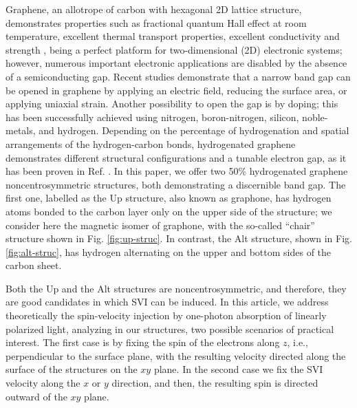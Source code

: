 \documentclass[floatfix,prb,aps,superscriptaddress,showpacs,11pt,preprint,letterpaper]{revtex4}
\begin{document}
Graphene, an allotrope of carbon with hexagonal 2D lattice structure,
demonstrates properties such as fractional quantum Hall effect at room
temperature, excellent thermal transport properties, excellent
conductivity\cite{heerscheNat07} and strength \cite{geimNM07, reinaNL08,
novoselov2S07, balandinNL08}, being a perfect platform  for two-dimensional (2D)
electronic systems; however, numerous important electronic applications are disabled by the
absence of a semiconducting gap. Recent studies demonstrate that a narrow band
gap  can be opened in graphene by applying an electric field,\cite{zhangN09}
reducing the surface area,\cite{hanPRL07} or applying uniaxial
strain.\cite{niACSN08} Another possibility to open the gap is by doping; this
has been successfully achieved using nitrogen,\cite{weiNL2009} 
boron-nitrogen,\cite{guoIJ11} silicon,\cite{colettiPRB10} 
noble-metals,\cite{varykhalovPRB10} and hydrogen.\cite{eliasS09, guisingerNL09,
samarakoonACSN10} Depending on the percentage of hydrogenation and spatial
arrangements of the hydrogen-carbon bonds, hydrogenated graphene demonstrates
different structural configurations and a tunable electron gap, as it has been
proven in Ref. . 
In this paper, we offer two 50\% hydrogenated graphene
noncentrosymmetric structures, both demonstrating a discernible band gap. The
first one, labelled as the Up structure, also known as
graphone,\cite{gmitraPRL13}  has
hydrogen atoms bonded to the carbon layer only on the upper side of the
structure; we consider here the magnetic isomer of graphone, with the so-called
``chair'' structure  shown in Fig. \ref{fig:up-struc}.
In contrast,  the Alt structure, shown in Fig. 
\ref{fig:alt-struc}, has hydrogen alternating on the upper and bottom sides of 
the carbon sheet.\cite{zapataPSB2016}

Both the Up and the Alt  structures
are noncentrosymmetric, and therefore,
they are good candidates in which SVI can be
induced. In this article, 
we address theoretically the spin-velocity injection
by one-photon absorption of linearly polarized light, analyzing
in our structures,
two possible scenarios of practical interest. 
The first case is by fixing the spin of the electrons along $z$, i.e.,
perpendicular 
to the surface plane, with the resulting velocity
directed along the surface of the
structures on the $xy$ plane. 
In the second case we fix the SVI velocity along the
$x$ or $y$ direction, and then, the resulting spin is directed outward of the
$xy$ plane. 
\end{document}

